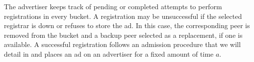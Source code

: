 

The advertiser keeps track of pending or completed attempts to perform registrations in every bucket.
A registration may be unsuccessful if the selected registrar is down or refuses to store the ad.
In this case, the corresponding peer is removed from the bucket and a backup peer selected as a replacement, if one is available.
A successful registration follows an admission procedure that we will detail in  and places an ad on an advertiser for a fixed amount of time $a$.


